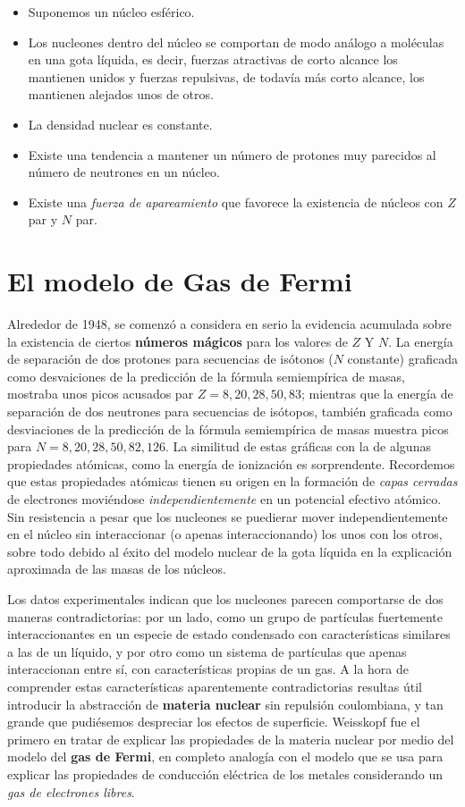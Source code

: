 \begin{itemize}
    \item Suponemos un núcleo esférico.
    \item Los nucleones dentro del núcleo se comportan de modo análogo a moléculas en una gota líquida, es decir, fuerzas atractivas de corto alcance los mantienen unidos y fuerzas repulsivas, de todavía más corto alcance, los mantienen alejados unos de otros.
    \item La densidad nuclear es constante. 
    \item Existe una tendencia a mantener un número de protones muy parecidos al número de neutrones en un núcleo.
    \item Existe una \textit{fuerza de apareamiento} que favorece la existencia de núcleos con $Z$ par y $N$ par.
\end{itemize}

\section{El modelo de Gas de Fermi}

Alrededor de 1948, se comenzó a considera en serio la evidencia acumulada sobre la existencia de ciertos \textbf{números mágicos} para los valores de $Z$ Y $N$. La energía de separación de dos protones para secuencias de isótonos ($N$ constante) graficada como desvaiciones de la predicción de la fórmula semiempírica de masas, mostraba unos picos acusados par $Z=8,20,28,50,83$; mientras que la energía de separación de dos neutrones para secuencias de isótopos, también graficada como desviaciones de la predicción de la fórmula semiempírica de masas muestra picos para $N=8,20,28,50,82,126$. La similitud de estas gráficas con la de algunas propiedades atómicas, como la energía de ionización es sorprendente. Recordemos que estas propiedades atómicas tienen su origen en la formación de \textit{capas cerradas} de electrones moviéndose \textit{independientemente} en un potencial efectivo atómico. Sin resistencia a pesar que los nucleones se puedierar mover independientemente en el núcleo sin interaccionar (o apenas interaccionando) los unos con los otros, sobre todo debido al éxito del modelo nuclear de la gota líquida en la explicación aproximada de las masas de los núcleos.

Los datos experimentales indican que los nucleones parecen comportarse de dos maneras contradictorias: por un lado, como un grupo de partículas fuertemente interaccionantes en un especie de estado condensado con características similares a las de un líquido, y por otro como un sistema de partículas que apenas interaccionan entre sí, con características propias de un gas. A la hora de comprender estas características aparentemente contradictorias resultas útil introducir la abstracción de \textbf{materia nuclear} sin repulsión coulombiana, y tan grande que pudiésemos despreciar los efectos de superficie. Weisskopf fue el primero en tratar de explicar las propiedades de la materia nuclear por medio del modelo del \textbf{gas de Fermi}, en completo analogía con el modelo que se usa para explicar las propiedades de conducción eléctrica de los metales considerando un \textit{gas de electrones libres}.

